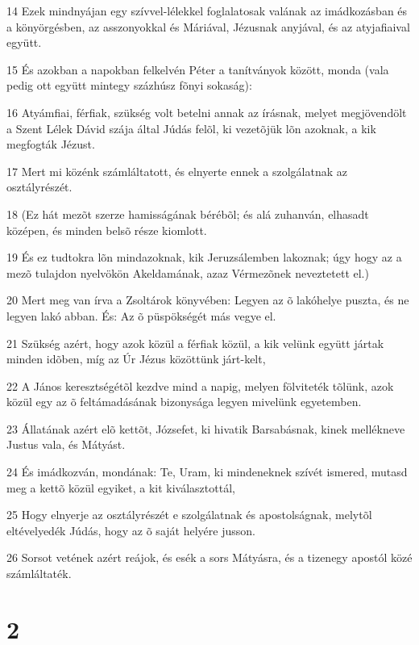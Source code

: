 \par 14 Ezek mindnyájan egy szívvel-lélekkel foglalatosak valának az imádkozásban és a könyörgésben, az asszonyokkal és Máriával, Jézusnak anyjával, és az atyjafiaival együtt.
\par 15 És azokban a napokban felkelvén Péter a tanítványok között, monda (vala pedig ott együtt mintegy százhúsz fõnyi sokaság):
\par 16 Atyámfiai, férfiak, szükség volt betelni annak az írásnak, melyet megjövendölt a Szent Lélek Dávid szája által Júdás felõl, ki vezetõjük  lõn azoknak, a kik megfogták Jézust.
\par 17 Mert mi közénk számláltatott, és elnyerte ennek a szolgálatnak az osztályrészét.
\par 18 (Ez hát mezõt szerze hamisságának bérébõl; és alá zuhanván, elhasadt középen, és minden belsõ része kiomlott.
\par 19 És ez tudtokra lõn mindazoknak, kik Jeruzsálemben lakoznak; úgy hogy az a mezõ tulajdon nyelvökön Akeldamának, azaz Vérmezõnek neveztetett el.)
\par 20 Mert meg van írva a Zsoltárok könyvében: Legyen az õ lakóhelye puszta, és ne legyen lakó abban. És: Az õ püspökségét más  vegye el.
\par 21 Szükség azért, hogy azok közül a férfiak közül, a kik velünk együtt jártak minden idõben, míg az Úr Jézus közöttünk járt-kelt,
\par 22 A János keresztségétõl kezdve mind a napig, melyen fölviteték tõlünk, azok közül egy az õ feltámadásának bizonysága legyen mivelünk egyetemben.
\par 23 Állatának azért elõ kettõt, Józsefet, ki hivatik Barsabásnak, kinek mellékneve Justus vala, és Mátyást.
\par 24 És imádkozván, mondának: Te, Uram, ki mindeneknek szívét ismered, mutasd meg a kettõ közül egyiket, a kit kiválasztottál,
\par 25 Hogy elnyerje az osztályrészét e szolgálatnak és apostolságnak, melytõl eltévelyedék Júdás, hogy az õ saját helyére jusson.
\par 26 Sorsot vetének azért reájok, és esék a sors Mátyásra, és a tizenegy apostól közé számláltaték.

\chapter{2}

